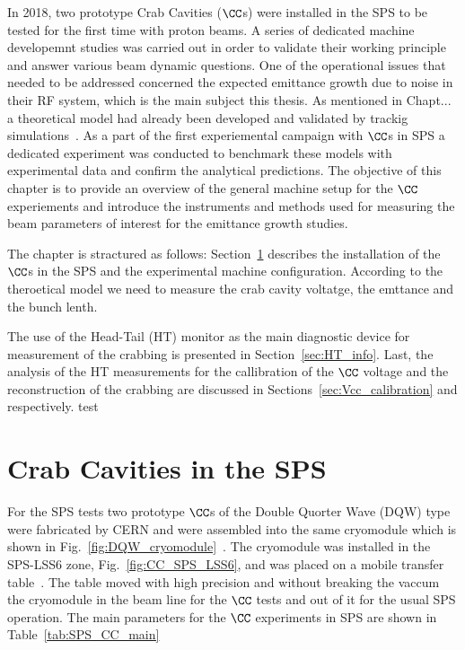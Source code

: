 \vspace*{-1mm}
In 2018, two prototype Crab Cavities ($\CC$s) were installed in the SPS to be tested for the first time with proton beams. A series of dedicated machine developemnt studies was carried out in order to validate their working principle and answer various beam dynamic questions. One of the operational issues that needed to be addressed concerned the expected emittance growth due to noise in their RF system, which is the main subject this thesis. As mentioned in Chapt... a theoretical model had already been developed and validated by trackig simulations~\cite{PhysRevSTAB.18.101001}. As a part of the first experiemental campaign with $\CC$s in SPS a dedicated experiment was conducted to benchmark these models with experimental data and confirm the analytical predictions. The objective of this chapter is to provide an overview of the general machine setup for the $\CC$ experiements and introduce the instruments and methods used for measuring the beam parameters of interest for the emittance growth studies.


The chapter is stractured as follows: Section~\ref{sec:CC_SPS_setup} describes the installation of the $\CC$s in the SPS and the experimental machine configuration. According to the theroetical model we need to measure the crab cavity voltatge, the emttance and the bunch lenth.


The use of the Head-Tail (HT) monitor as the main diagnostic device for measurement of the crabbing is presented in Section~\ref{sec:HT_info}. Last, the analysis of the HT measurements for the callibration of the $\CC$ voltage and the reconstruction of the crabbing are discussed in Sections~\ref{sec:Vcc_calibration} and respectively. test

\section{Crab Cavities in the SPS}\label{sec:CC_SPS_setup}

For the SPS tests two prototype $\CC$s of the Double Quorter Wave (DQW) type were fabricated by CERN and were assembled into the same cryomodule which is shown in Fig.~\ref{fig:DQW_cryomodule}~\cite{Zanoni:2017}. The cryomodule was installed in the SPS-LSS6 zone, Fig.~\ref{fig:CC_SPS_LSS6}, and was placed on a mobile transfer table~\cite{Calaga:2649807}. The table moved with high precision and without breaking the vaccum the cryomodule in the beam line for the $\CC$ tests and out of it for the usual SPS operation. The main parameters for the $\CC$ experiments in SPS are shown in Table~\ref{tab:SPS_CC_main}


